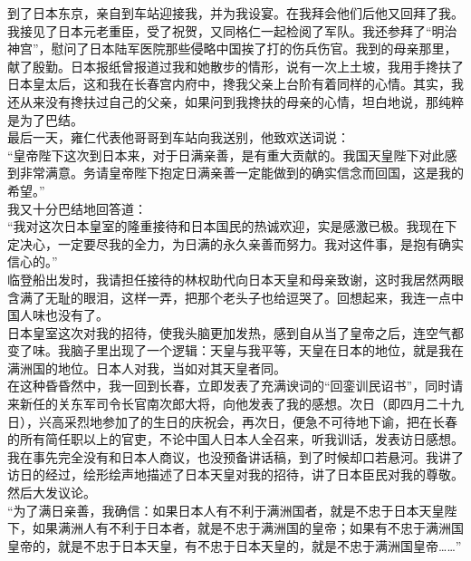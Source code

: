 到了日本东京，亲自到车站迎接我，并为我设宴。在我拜会他们后他又回拜了我。我接见了日本元老重臣，受了祝贺，又同格仁一起检阅了军队。我还参拜了“明治神宫”，慰问了日本陆军医院那些侵略中国挨了打的伤兵伤官。我到的母亲那里，献了殷勤。日本报纸曾报道过我和她散步的情形，说有一次上土坡，我用手搀扶了日本皇太后，这和我在长春宫内府中，搀我父亲上台阶有着同样的心情。其实，我还从来没有搀扶过自己的父亲，如果问到我搀扶的母亲的心情，坦白地说，那纯粹是为了巴结。\\

最后一天，雍仁代表他哥哥到车站向我送别，他致欢送词说：\\

“皇帝陛下这次到日本来，对于日满亲善，是有重大贡献的。我国天皇陛下对此感到非常满意。务请皇帝陛下抱定日满亲善一定能做到的确实信念而回国，这是我的希望。”\\

我又十分巴结地回答道：\\

“我对这次日本皇室的隆重接待和日本国民的热诚欢迎，实是感激已极。我现在下定决心，一定要尽我的全力，为日满的永久亲善而努力。我对这件事，是抱有确实信心的。”\\

临登船出发时，我请担任接待的林权助代向日本天皇和母亲致谢，这时我居然两眼含满了无耻的眼泪，这样一弄，把那个老头子也给逗哭了。回想起来，我连一点中国人味也没有了。\\

日本皇室这次对我的招待，使我头脑更加发热，感到自从当了皇帝之后，连空气都变了味。我脑子里出现了一个逻辑：天皇与我平等，天皇在日本的地位，就是我在满洲国的地位。日本人对我，当如对其天皇者同。\\

在这种昏昏然中，我一回到长春，立即发表了充满谀词的“回銮训民诏书”，同时请来新任的关东军司令长官南次郎大将，向他发表了我的感想。次日（即四月二十九日），兴高采烈地参加了的生日的庆祝会，再次日，便急不可待地下谕，把在长春的所有简任职以上的官吏，不论中国人日本人全召来，听我训话，发表访日感想。我在事先完全没有和日本人商议，也没预备讲话稿，到了时候却口若悬河。我讲了访日的经过，绘形绘声地描述了日本天皇对我的招待，讲了日本臣民对我的尊敬。然后大发议论。\\

“为了满日亲善，我确信：如果日本人有不利于满洲国者，就是不忠于日本天皇陛下，如果满洲人有不利于日本者，就是不忠于满洲国的皇帝；如果有不忠于满洲国皇帝的，就是不忠于日本天皇，有不忠于日本天皇的，就是不忠于满洲国皇帝……”\\

